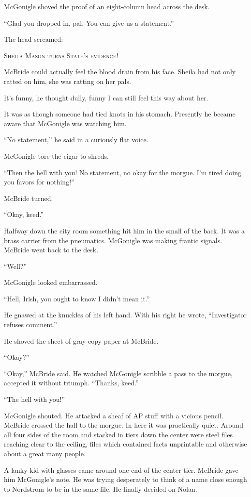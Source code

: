 \documentclass{novel}
\begin{document}
McGonigle shoved the proof of an eight-column head across the desk.

“Glad you dropped in, pal. You can give us a statement.”

The head screamed: 

\textsc{Sheila Mason turns State’s evidence!}

McBride could actually feel the blood drain from his face. Sheila had not only ratted on him, she was ratting on her pals.

It’s funny, he thought dully, funny I can still feel this way about her.

It was as though someone had tied knots in his stomach. Presently he became aware that McGonigle was watching him.

“No statement,” he said in a curiously flat voice.

McGonigle tore the cigar to shreds.

“Then the hell with you! No statement, no okay for the morgue. I’m tired doing you favors for nothing!”

McBride turned.

“Okay, keed.”

\null

Halfway down the city room something hit him in the small of the back. It was a brass carrier from the pneumatics. McGonigle was making frantic signals. McBride went back to the desk.

“Well?”

McGonigle looked embarrassed.

“Hell, Irish, you ought to know I didn’t mean it.”

He gnawed at the knuckles of his left hand. With his right he wrote, “Investigator refuses comment.”

He shoved the sheet of gray copy paper at McBride.

“Okay?”

“Okay,” McBride said. He watched McGonigle scribble a pass to the morgue, accepted it without triumph. “Thanks, keed.”

“The hell with you!”

McGonigle shouted. He attacked a sheaf of AP stuff with a vicious pencil. McBride crossed the hall to the morgue. In here it was practically quiet. Around all four sides of the room and stacked in tiers down the center were steel files reaching clear to the ceiling, files which contained facts unprintable and otherwise about a great many people.

A lanky kid with glasses came around one end of the center tier. McBride gave him McGonigle’s note. He was trying desperately to think of a name close enough to Nordstrom to be in the same file. He finally decided on Nolan.
\end{document}
